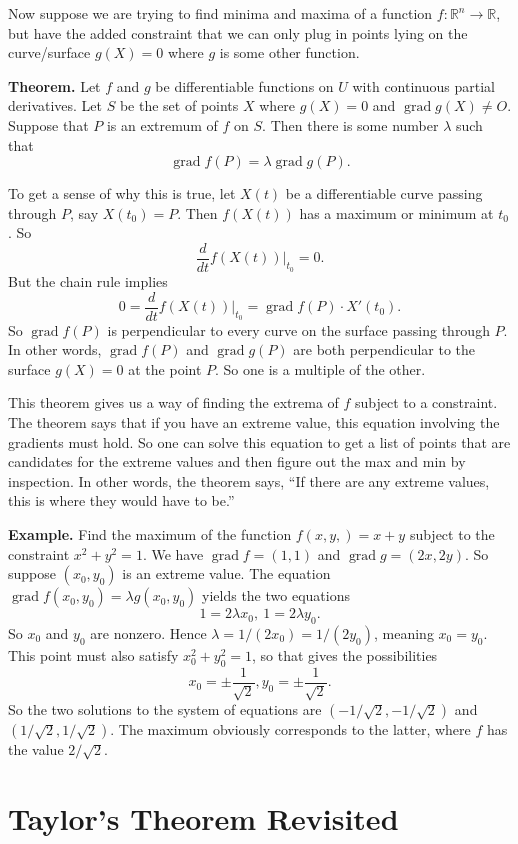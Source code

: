 \documentclass{article}
\DeclareMathOperator{\grd}{grad}
\begin{document}
Now suppose we are trying to find minima and maxima of a function
$f:\mathbb{R}^n \to \mathbb{R}$, but have the added constraint
that we can only plug in points lying on the curve/surface $g(X)=0$
where $g$ is some other function.

\textbf{Theorem.} Let $f$ and $g$ be differentiable functions on $U$ with
continuous partial derivatives. Let $S$ be the set of points $X$
where $g(X)=0$ and $\grd g(X) \neq O$. Suppose that $P$ is 
an extremum of $f$ on $S$. Then there is some number $\lambda$ such that
\[\grd f(P) = \lambda \grd g(P).\]

To get a sense of why this is true, let $X(t)$ be a 
differentiable curve passing through $P$, say $X(t_0)=P$.
Then $f(X(t))$ has a maximum or minimum at $t_0$. So 
\[\frac{d}{dt} f(X(t)) \bigg\vert_{t_0} =0.\]
But the chain rule implies
\[0=\frac{d}{dt} f(X(t)) \bigg\vert_{t_0} = \grd f(P) \cdot X'(t_0).\]
So $\grd f(P)$ is perpendicular to every curve on the surface
passing through $P$. In other words, $\grd f(P)$ and $\grd g(P)$
are both perpendicular to the surface $g(X)=0$ at the point $P$.
So one is a multiple of the other.

This theorem gives us a way of finding the extrema of $f$ subject to
a constraint. The theorem says that if you have an extreme value,
this equation involving the gradients must hold. So one can solve this equation
to get a list of points that are candidates for the extreme values and then figure out the
max and min by inspection. In other words, the theorem says, 
``If there are any extreme values, this is where they would have to be.''

\textbf{Example.} Find the maximum of the function $f(x,y,)=x+y$
subject to the constraint $x^2 + y^2 = 1$. We have $\grd f = (1,1)$
and $\grd g = (2x,2y)$. So suppose $(x_0,y_0)$ is an extreme value.
The equation $\grd f(x_0,y_0)  = \lambda g(x_0,y_0)$ yields the 
two equations
\[1=2\lambda x_0,\ 1 = 2\lambda y_0.\]
So $x_0$ and $y_0$ are nonzero. Hence $\lambda = 1/(2x_0) = 1/(2y_0)$,
meaning $x_0 = y_0$. This point must also satisfy $x_0^2 + y_0^2 = 1$,
so that gives the possibilities 
\[x_0 = \pm \frac{1}{\sqrt{2}}, y_0 = \pm \frac{1}{\sqrt{2}}.\]
So the two solutions to the system of equations are $(-1/\sqrt{2},-1/\sqrt{2})$
and $(1/\sqrt{2},1/\sqrt{2})$. The maximum obviously corresponds to the
latter, where $f$ has the value $2/\sqrt{2}$.

\section*{Taylor's Theorem Revisited}
\end{document}
